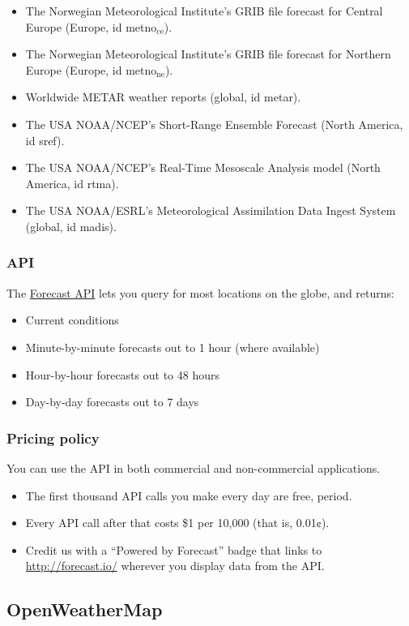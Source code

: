 \documentclass[11pt]{article}
\begin{document}
\begin{itemize}
\item The Norwegian Meteorological Institute’s GRIB file forecast for Central Europe (Europe, id metno$_{\text{ce}}$).
\item The Norwegian Meteorological Institute’s GRIB file forecast for Northern Europe (Europe, id metno$_{\text{ne}}$).
\item Worldwide METAR weather reports (global, id metar).
\item The USA NOAA/NCEP’s Short-Range Ensemble Forecast (North America, id sref).
\item The USA NOAA/NCEP’s Real-Time Mesoscale Analysis model (North America, id rtma).
\item The USA NOAA/ESRL’s Meteorological Assimilation Data Ingest System (global, id madis).
\end{itemize}
\subsubsection{API}
\label{sec-2-6-2}
The \href{https://developer.forecast.io/docs/v2}{Forecast API} lets you query for most locations on the globe, and returns:

\begin{itemize}
\item Current conditions
\item Minute-by-minute forecasts out to 1 hour (where available)
\item Hour-by-hour forecasts out to 48 hours
\item Day-by-day forecasts out to 7 days
\end{itemize}
\subsubsection{Pricing policy}
\label{sec-2-6-3}
You can use the API in both commercial and non-commercial applications.

\begin{itemize}
\item The first thousand API calls you make every day are free, period.
\item Every API call after that costs \$1 per 10,000 (that is, 0.01¢).
\item Credit us with a “Powered by Forecast” badge that links to \url{http://forecast.io/} wherever you display data from the API.
\end{itemize}

\subsection{OpenWeatherMap}
\label{sec-2-7}
\end{document}
